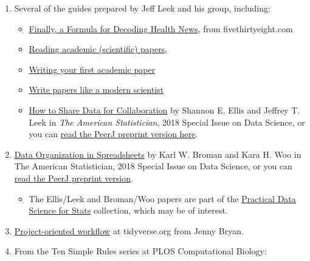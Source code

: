 \documentclass[
]{book}
\providecommand{\tightlist}{%
  \setlength{\itemsep}{0pt}\setlength{\parskip}{0pt}}
\begin{document}
\begin{enumerate}
\def\labelenumi{\arabic{enumi}.}
\tightlist
\item
  Several of the guides prepared by Jeff Leek and his group, including:

  \begin{itemize}
  \tightlist
  \item
    \href{https://fivethirtyeight.com/features/a-formula-for-decoding-health-news/}{Finally, a Formula for Decoding Health News}, from fivethirtyeight.com
  \item
    \href{https://github.com/jtleek/readingpapers}{Reading academic (scientific) papers},
  \item
    \href{https://github.com/jtleek/firstpaper}{Writing your first academic paper}
  \item
    \href{https://simplystatistics.org/2016/04/21/writing/}{Write papers like a modern scientist}
  \item
    \href{https://www.tandfonline.com/doi/abs/10.1080/00031305.2017.1375987}{How to Share Data for Collaboration} by Shannon E. Ellis and Jeffrey T. Leek in \emph{The American Statistician}, 2018 Special Issue on Data Science, or you can \href{https://peerj.com/preprints/3139/}{read the PeerJ preprint version here}.
  \end{itemize}
\item
  \href{https://www.tandfonline.com/doi/full/10.1080/00031305.2017.1375989}{Data Organization in Spreadsheets} by Karl W. Broman and Kara H. Woo in The American Statistician, 2018 Special Issue on Data Science, or you can \href{https://peerj.com/preprints/3183/}{read the PeerJ preprint version}.

  \begin{itemize}
  \tightlist
  \item
    The Ellis/Leek and Broman/Woo papers are part of the \href{https://peerj.com/collections/50-practicaldatascistats/}{Practical Data Science for Stats} collection, which may be of interest.
  \end{itemize}
\item
  \href{https://www.tidyverse.org/articles/2017/12/workflow-vs-script/}{Project-oriented workflow} at tidyverse.org from Jenny Bryan.
\item
  From the Ten Simple Rules series at PLOS Computational Biology:


\end{enumerate}
\end{document}
